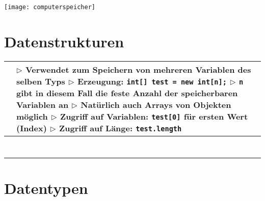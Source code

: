 	\begin{center}
	\texttt{[image: computerspeicher]}
	\end{center}

\section{Datenstrukturen}

\begin{tabular}{ | p{4cm} p{13.5cm} | }
	\hline
	\makecell[l]{Array} & 
	\makecell[l]{$\rhd$ Verwendet zum Speichern von mehreren Variablen des selben Typs \\
	$\rhd$ Erzeugung: \texttt{int[] test = new int[n];} \\
	$\rhd$ \texttt{n} gibt in diesem Fall die feste Anzahl der speicherbaren Variablen an \\
	$\rhd$ Natürlich auch Arrays von Objekten möglich \\
	$\rhd$ Zugriff auf Variablen: \texttt{test[0]} für ersten Wert (Index) \\
	$\rhd$ Zugriff auf Länge: \texttt{test.length} } \\ \hline
	
	\makecell[l]{} & \makecell[l]{$\rhd$  } \\ \hline
	
	\makecell[l]{} & \makecell[l]{$\rhd$  } \\ \hline
	
	\makecell[l]{} & \makecell[l]{$\rhd$  } \\ \hline
	
	\makecell[l]{} & \makecell[l]{$\rhd$  } \\ \hline
	
	\makecell[l]{} & \makecell[l]{$\rhd$  } \\ \hline
	
	\makecell[l]{} & \makecell[l]{$\rhd$  } \\ \hline
	
	\makecell[l]{} & \makecell[l]{$\rhd$  } \\ \hline
	\end{tabular}



\section{Datentypen}

